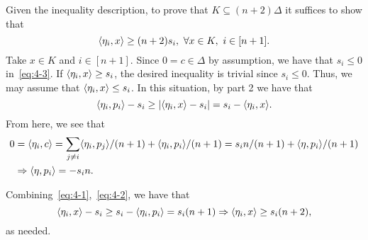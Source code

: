 {\begin{enumerate}
Given the inequality description, to prove that $K \subseteq (n+2)\Delta$ it
suffices to show that
\[
\langle{\eta_i, x}\rangle \geq (n+2)s_i,~ \forall x \in K,~ i \in [n+1].
\]
Take $x \in K$ and $i \in [n+1]$. Since $0 = c \in \Delta$ by assumption, we
have that $s_i \leq 0$ in~\eqref{eq:4-3}. If $\langle{\eta_i, x}\rangle \geq s_i$, the desired
inequality is trivial since $s_i \leq 0$. Thus, we may assume that
$\langle{\eta_i, x}\rangle \leq s_i$. In this situation, by part 2 we have that
\begin{equation}
\label{eq:4-1}
\langle{\eta_i, p_i}\rangle-s_i \geq |\langle{\eta_i, x}\rangle-s_i| = s_i-\langle{\eta_i, x}\rangle .   
\end{equation}
From here, we see that
\begin{align}
0 &= \langle{\eta_i, c}\rangle = \sum_{j \neq i} \langle{\eta_i, p_j}\rangle/(n+1) +
\langle{\eta_i, p_i}\rangle/(n+1) = s_i n/(n+1) + \langle{\eta, p_i}\rangle/(n+1) \nonumber \\
  &\Rightarrow \langle{\eta, p_i}\rangle = - s_i n \label{eq:4-2} .
\end{align}

Combining~\eqref{eq:4-1},~\eqref{eq:4-2}, we have that 
\[
\langle{\eta_i, x}\rangle-s_i \geq s_i-\langle{\eta_i, p_i}\rangle = s_i(n+1)
\Rightarrow \langle{\eta_i, x}\rangle \geq s_i(n+2),  
\]
as needed.
\end{enumerate}
}

